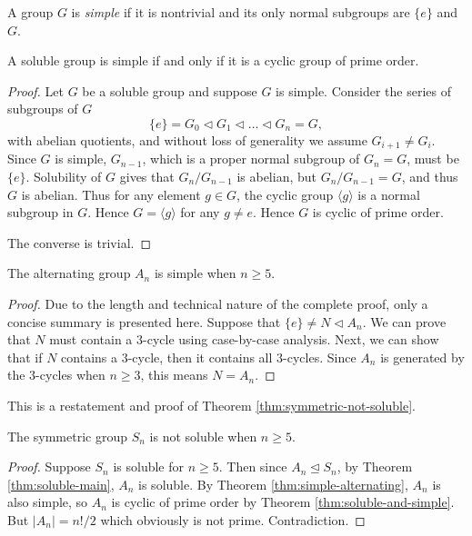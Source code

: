 \begin{definition}
	A group $G$ is \textit{simple} if it is nontrivial and its only normal subgroups are $\{ e \}$ and $G$. 
\end{definition}

\begin{theorem} \label{thm:soluble-and-simple}
	A soluble group is simple if and only if it is a cyclic group of prime order.
\end{theorem}

\begin{proof}
	Let $G$ be a soluble group and suppose $G$ is simple. Consider the series of subgroups of $G$
	$$
	\{ e \}=G_0 \triangleleft G_1 \triangleleft \ldots \triangleleft G_n=G,
	$$
	with abelian quotients, and without loss of generality we assume $G_{i+1} \neq G_i$. Since $G$ is simple, $G_{n-1}$, which is a proper normal subgroup of $G_n = G$, must be $\{ e \}$. Solubility of $G$ gives that $G_n / G_{n -1 }$ is abelian, but $G_n / G_{n - 1} = G$, and thus $G$ is abelian. Thus for any element $g \in G$, the cyclic group $\langle g\rangle$ is a normal subgroup in $G$. Hence  $G = \langle g\rangle$ for any $g \neq e$. Hence $G$ is cyclic of prime order.
	
	The converse is trivial.
\end{proof}


\begin{theorem} \label{thm:simple-alternating}
	The alternating group $A_n$ is simple when $n \ge 5$. 
\end{theorem}

\begin{proof}
    Due to the length and technical nature of the complete proof, only a concise summary is presented here. 
	Suppose that $\{ e \} \neq N \triangleleft A_n$. We can prove that $N$ must contain a $3$-cycle using case-by-case analysis. Next, we can show that if $N$ contains a $3$-cycle, then it contains all $3$-cycles. Since $A_n$ is generated by the $3$-cycles when $n \ge 3$, this means $N = A_n$.
\end{proof}

This is a restatement and proof of Theorem \ref{thm:symmetric-not-soluble}. 

\begin{theorem} \label{thm:symmetric-not-soluble-appendix}
	The symmetric group $S_n$ is not soluble when $n \ge 5$. 
\end{theorem}

\begin{proof}
	Suppose $S_n$ is soluble for $n \ge 5$. Then since $A_n \trianglelefteq S_n$, by Theorem \ref{thm:soluble-main}, $A_n$ is soluble. By Theorem \ref{thm:simple-alternating}, $A_n$ is also simple, so $A_n$ is cyclic of prime order by Theorem \ref{thm:soluble-and-simple}. But $|A_n| = n! / 2$ which obviously is not prime. Contradiction.
\end{proof}

